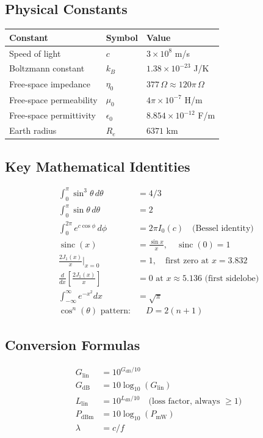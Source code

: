 \documentclass[10pt,letterpaper]{article}
\newcommand{\sinc}{\operatorname{sinc}}
\begin{document}
\subsection{Physical Constants}
\begin{center}
\begin{tabular}{lll}
\toprule
\textbf{Constant} & \textbf{Symbol} & \textbf{Value} \\
\midrule
Speed of light & $c$ & $3\times10^8$ m/s \\
Boltzmann constant & $k_B$ & $1.38\times10^{-23}$ J/K \\
Free-space impedance & $\eta_0$ & $377\,\Omega \approx 120\pi\,\Omega$ \\
Free-space permeability & $\mu_0$ & $4\pi\times10^{-7}$ H/m \\
Free-space permittivity & $\epsilon_0$ & $8.854\times10^{-12}$ F/m \\
Earth radius & $R_e$ & $6371$ km \\
\bottomrule
\end{tabular}
\end{center}

\subsection{Key Mathematical Identities}

\begin{tcolorbox}[purplebox, title={Essential Identities for Exam}]
\begin{align}
  \int_0^\pi\sin^3\theta\,d\theta &= 4/3 \\
  \int_0^\pi\sin\theta\,d\theta &= 2 \\
  \int_0^{2\pi}e^{c\cos\phi}\,d\phi &= 2\pi I_0(c) \quad\text{(Bessel identity)} \\
  \sinc(x) &= \frac{\sin x}{x}, \quad \sinc(0) = 1 \\
  \frac{2J_1(x)}{x}\bigg|_{x=0} &= 1, \quad\text{first zero at }x = 3.832 \\
  \frac{d}{dx}\left[\frac{2J_1(x)}{x}\right] &= 0\text{ at }x\approx5.136\text{ (first sidelobe)} \\
  \int_{-\infty}^{\infty}e^{-x^2}dx &= \sqrt{\pi} \\
  \cos^n(\theta)\text{ pattern:} & \quad D = 2(n+1)
\end{align}
\end{tcolorbox}

\subsection{Conversion Formulas}
\begin{align}
  G_\mathrm{lin} &= 10^{G_\mathrm{dB}/10} \\
  G_\mathrm{dB} &= 10\log_{10}(G_\mathrm{lin}) \\
  L_\mathrm{lin} &= 10^{L_\mathrm{dB}/10} \quad\text{(loss factor, always $\geq1$)} \\
  P_\mathrm{dBm} &= 10\log_{10}(P_\mathrm{mW}) \\
  \lambda &= c/f
\end{align}
\end{document}
